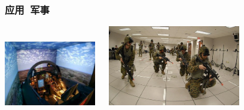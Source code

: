 \documentclass{beamer}
\begin{document}
\begin{frame}
	\frametitle{应用~{\small 军事}}
	\begin{center}
		\includegraphics[width=4cm]{images/virtual-reality-plane-trainer-cockpit.jpg}~~
		\includegraphics[width=6cm, height=3.5cm]{images/military.jpg}
	\end{center}
\end{frame}
\end{document}
